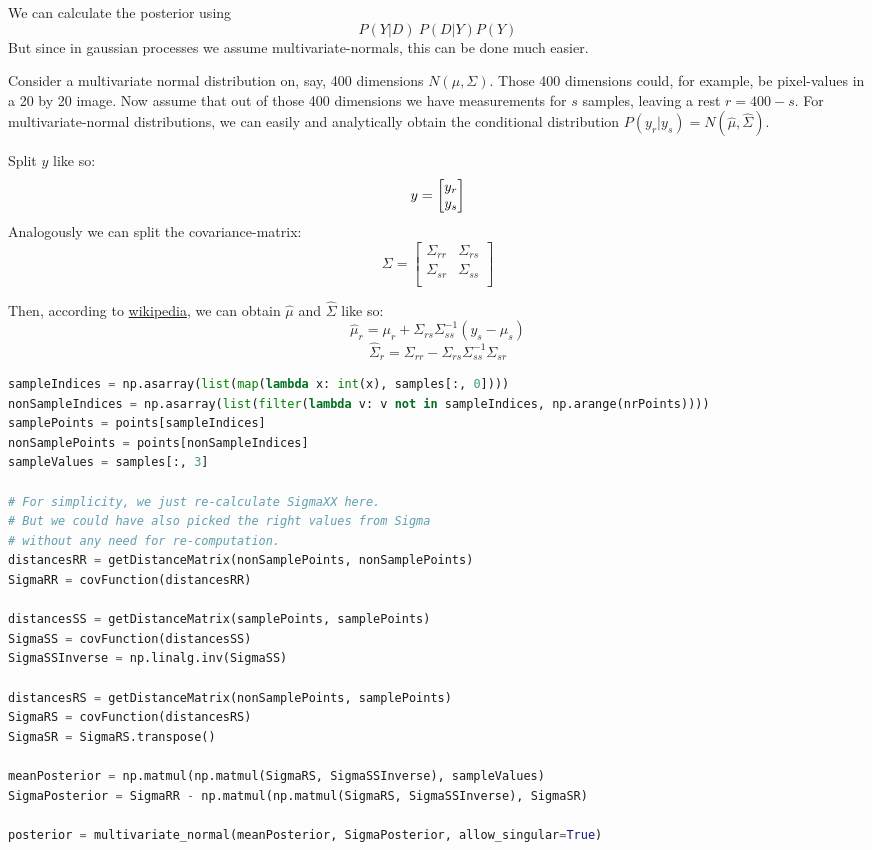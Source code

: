 We can calculate the posterior using 
$$
P(Y|D) ~ P(D|Y) P(Y)
$$
But since in gaussian processes we assume multivariate-normals, this can be done much easier.

Consider a multivariate normal distribution on, say, 400 dimensions $N(\mu, \Sigma)$. Those 400 dimensions could, for example, be pixel-values in a 20 by 20 image.
Now assume that out of those 400 dimensions we have measurements for $s$ samples, leaving a rest $r = 400 - s$.
For multivariate-normal distributions, we can easily and analytically obtain the conditional distribution $P(y_r | y_s) = N(\hat{\mu}, \hat{\Sigma})$.

Split $y$ like so:
$$ y =  \begin{bmatrix} y_r \\ y_s \\ \end{bmatrix}  $$
Analogously we can split the covariance-matrix:
$$ \Sigma = \begin{bmatrix}
    \Sigma_{rr} & \Sigma_{rs} \\
    \Sigma_{sr} & \Sigma_{ss} \\
\end{bmatrix}  $$

Then, according to \href{https://en.wikipedia.org/wiki/Multivariate_normal_distribution#Conditional_distributions}{wikipedia}, we can obtain $\hat{\mu}$ and $\hat{\Sigma}$ like so:
$$ \hat{\mu}_r = \mu_r + \Sigma_{rs} \Sigma_{ss}^{-1} (y_s - \mu_s) $$
$$ \hat{\Sigma}_r = \Sigma_{rr} - \Sigma_{rs} \Sigma_{ss}^{-1} \Sigma_{sr} $$

\begin{lstlisting}[language=python]
sampleIndices = np.asarray(list(map(lambda x: int(x), samples[:, 0])))
nonSampleIndices = np.asarray(list(filter(lambda v: v not in sampleIndices, np.arange(nrPoints))))
samplePoints = points[sampleIndices]
nonSamplePoints = points[nonSampleIndices]
sampleValues = samples[:, 3]

# For simplicity, we just re-calculate SigmaXX here.
# But we could have also picked the right values from Sigma
# without any need for re-computation.
distancesRR = getDistanceMatrix(nonSamplePoints, nonSamplePoints)
SigmaRR = covFunction(distancesRR)

distancesSS = getDistanceMatrix(samplePoints, samplePoints)
SigmaSS = covFunction(distancesSS)
SigmaSSInverse = np.linalg.inv(SigmaSS)

distancesRS = getDistanceMatrix(nonSamplePoints, samplePoints)
SigmaRS = covFunction(distancesRS)
SigmaSR = SigmaRS.transpose()

meanPosterior = np.matmul(np.matmul(SigmaRS, SigmaSSInverse), sampleValues)
SigmaPosterior = SigmaRR - np.matmul(np.matmul(SigmaRS, SigmaSSInverse), SigmaSR)

posterior = multivariate_normal(meanPosterior, SigmaPosterior, allow_singular=True)    
\end{lstlisting}





